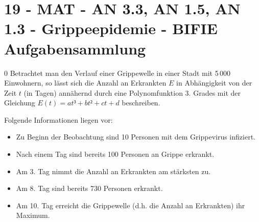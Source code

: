\section{19 - MAT - AN 3.3, AN 1.5, AN 1.3 - Grippeepidemie - BIFIE Aufgabensammlung}

\begin{langesbeispiel} \item[0] %
				Betrachtet man den Verlauf einer Grippewelle in einer Stadt mit 5\,000 Einwohnern, so lässt sich die Anzahl an Erkrankten $E$ in Abhängigkeit von der Zeit $t$ (in Tagen) annähernd durch eine Polynomfunktion 3. Grades mit der Gleichung $E(t)=at³+bt²+ct+d$ beschreiben.
				
				Folgende Informationen liegen vor:
				
				
				\begin{itemize}
					\item Zu Beginn der Beobachtung sind 10 Personen mit dem Grippevirus infiziert.
					\item Nach einem Tag sind bereits 100 Personen an Grippe erkrankt.
					\item Am 3. Tag nimmt die Anzahl an Erkrankten am stärksten zu.
					\item Am 8. Tag sind bereits 730 Personen erkrankt.
					\item Am 10. Tag erreicht die Grippewelle (d.h. die Anzahl an Erkrankten) ihr Maximum.
				\end{itemize}
				
				\begin{center}
\end{center}


\end{langesbeispiel}
